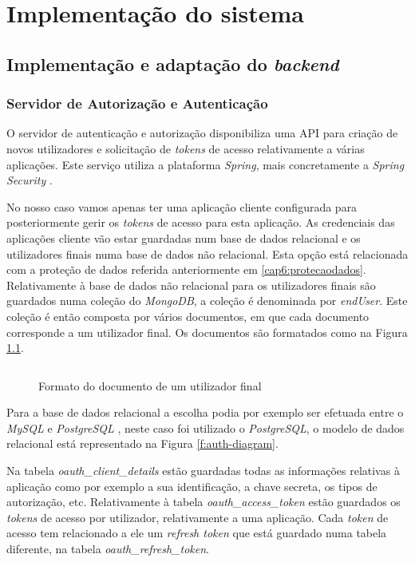 \chapter{Implementação do sistema}

\section{Implementação e adaptação do \textit{backend}}

\subsection{Servidor de Autorização e Autenticação}
O servidor de autenticação e autorização disponibiliza uma \gls{API} para criação de novos utilizadores e solicitação de \textit{tokens} de acesso relativamente a várias aplicações. Este serviço utiliza a plataforma \textit{Spring}, mais concretamente a \textit{Spring Security} \cite{spring-framework}. \par 
No nosso caso vamos apenas ter uma aplicação cliente configurada para posteriormente gerir os \textit{tokens} de acesso para esta aplicação. As credenciais das aplicações cliente vão estar guardadas num base de dados relacional e os utilizadores finais numa base de dados não relacional. Esta opção está relacionada com a proteção de dados referida anteriormente em \ref{cap6:protecaodados}. 
Relativamente à base de dados não relacional para os utilizadores finais são guardados numa coleção do \textit{MongoDB}\cite{mongodb}, a coleção é denominada por \textit{endUser}. Este coleção é então composta por vários documentos, em que cada documento corresponde a um utilizador final. Os documentos são formatados como na Figura \ref{f:endUserCode}.

\begin{figure}[H]
\inputminted[fontsize=\scriptsize]{json}{code/endUser.json}
\caption[Formato do documento de um utilizador final]{Formato do documento de um utilizador final}
\label{f:endUserCode}
\end{figure}

Para a base de dados relacional a escolha podia por exemplo ser efetuada entre o  \textit{MySQL} \cite{mysql} e  \textit{PostgreSQL} \cite{postgresql}, neste caso foi utilizado o  \textit{PostgreSQL}, o modelo de dados relacional está representado na Figura \ref{f:auth-diagram}. \par 
Na tabela  \textit{oauth\_client\_details} estão guardadas todas as informações relativas à aplicação como por exemplo a sua identificação, a chave secreta, os tipos de autorização, etc. Relativamente à tabela  \textit{oauth\_access\_token} estão guardados os  \textit{tokens} de acesso por utilizador, relativamente a uma aplicação. Cada  \textit{token} de acesso tem relacionado a ele  um  \textit{refresh token} que está guardado numa tabela diferente, na tabela  \textit{oauth\_refresh\_token}.

